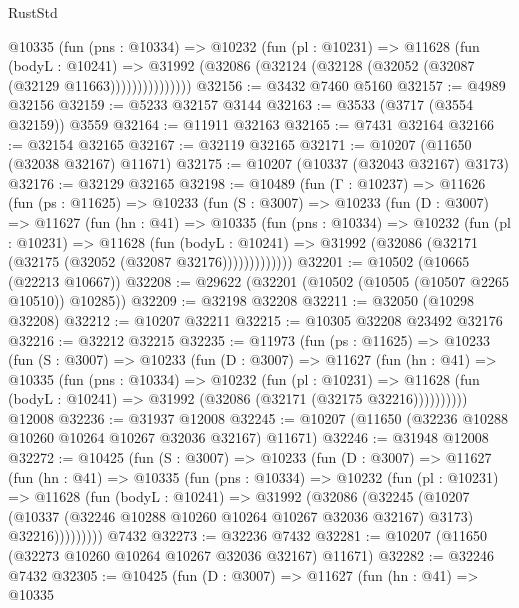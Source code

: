 \begin{lexlean}{RustStd}
\begin{coremodule}
              @10335
                (fun (pns : @10334) =>
                @10232
                  (fun (pl : @10231) =>
                  @11628
                    (fun (bodyL : @10241) =>
                    @31992 (@32086 (@32124 (@32128 (@32052 (@32087 (@32129 @11663)))))))))))))))
@32156 := @3432 @7460 @5160
@32157 := @4989 @32156
@32159 := @5233 @32157 @3144
@32163 := @3533 (@3717 (@3554 @32159)) @3559
@32164 := @11911 @32163
@32165 := @7431 @32164
@32166 := @32154 @32165
@32167 := @32119 @32165
@32171 := @10207 (@11650 (@32038 @32167) @11671)
@32175 := @10207 (@10337 (@32043 @32167) @3173)
@32176 := @32129 @32165
@32198 := @10489
    (fun (Γ : @10237) =>
    @11626
      (fun (ps : @11625) =>
      @10233
        (fun (S : @3007) =>
        @10233
          (fun (D : @3007) =>
          @11627
            (fun (hn : @41) =>
            @10335
              (fun (pns : @10334) =>
              @10232
                (fun (pl : @10231) =>
                @11628
                  (fun (bodyL : @10241) =>
                  @31992 (@32086 (@32171 (@32175 (@32052 (@32087 @32176)))))))))))))
@32201 := @10502 (@10665 (@22213 @10667))
@32208 := @29622 (@32201 (@10502 (@10505 (@10507 @2265 @10510)) @10285))
@32209 := @32198 @32208
@32211 := @32050 (@10298 @32208)
@32212 := @10207 @32211
@32215 := @10305 @32208 @23492 @32176
@32216 := @32212 @32215
@32235 := @11973
    (fun (ps : @11625) =>
    @10233
      (fun (S : @3007) =>
      @10233
        (fun (D : @3007) =>
        @11627
          (fun (hn : @41) =>
          @10335
            (fun (pns : @10334) =>
            @10232
              (fun (pl : @10231) =>
              @11628 (fun (bodyL : @10241) => @31992 (@32086 (@32171 (@32175 @32216))))))))))
    @12008
@32236 := @31937 @12008
@32245 := @10207 (@11650 (@32236 @10288 @10260 @10264 @10267 @32036 @32167) @11671)
@32246 := @31948 @12008
@32272 := @10425
    (fun (S : @3007) =>
    @10233
      (fun (D : @3007) =>
      @11627
        (fun (hn : @41) =>
        @10335
          (fun (pns : @10334) =>
          @10232
            (fun (pl : @10231) =>
            @11628
              (fun (bodyL : @10241) =>
              @31992
                (@32086
                  (@32245
                    (@10207
                      (@10337 (@32246 @10288 @10260 @10264 @10267 @32036 @32167) @3173)
                      @32216)))))))))
    @7432
@32273 := @32236 @7432
@32281 := @10207 (@11650 (@32273 @10260 @10264 @10267 @32036 @32167) @11671)
@32282 := @32246 @7432
@32305 := @10425
    (fun (D : @3007) =>
    @11627
      (fun (hn : @41) =>
      @10335

\end{coremodule}
\end{lexlean}

